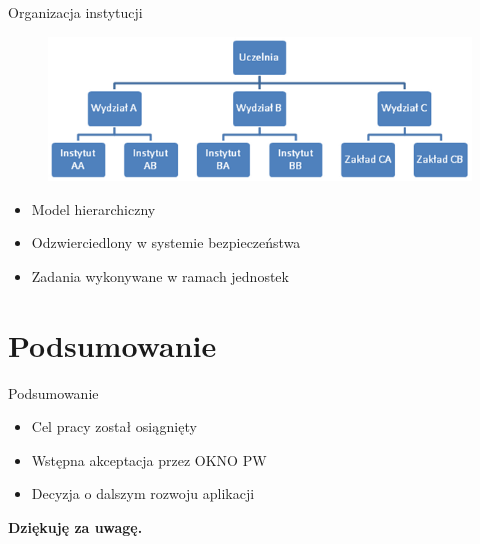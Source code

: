 \documentclass[10pt,utf8]{beamer}
\begin{document}
\begin{frame}{Organizacja instytucji}
	\begin{figure}[h]
    \begin{center}
    \includegraphics[angle=0,scale=0.7]{organizacja.png}
    \end{center} 
	\end{figure}
	\begin{itemize}
		\item Model hierarchiczny
		\item Odzwierciedlony w systemie bezpieczeństwa
		\item Zadania wykonywane w ramach jednostek
	\end{itemize}
\end{frame}

\section{Podsumowanie}
\begin{frame}{Podsumowanie}
	\begin{itemize}
		\item Cel pracy został osiągnięty
		\item Wstępna akceptacja przez OKNO PW
		\item Decyzja o dalszym rozwoju aplikacji
	\end{itemize}
\end{frame}

\begin{frame}
	\begin{center}
	\textbf{
	\LARGE
	Dziękuję za uwagę.
	}
	\end{center}
\end{frame}
\end{document}

